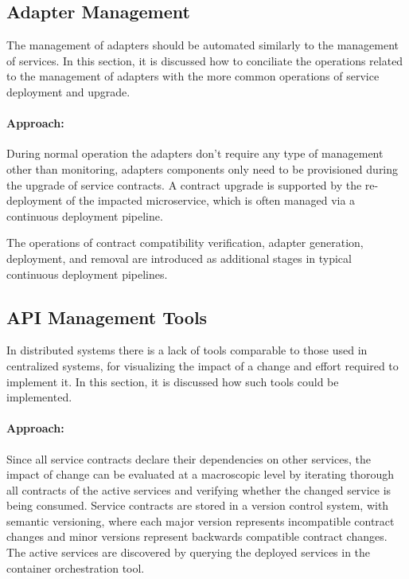 \subsection{Adapter Management} %
\label{sec:adapter_management}

The management of adapters should be automated similarly to the management of services.
In this section, it is discussed how to conciliate the operations related to the management of adapters with the more common operations of service deployment and upgrade.

\paragraph{Approach:}
During normal operation the adapters don't require any type of management other than monitoring,
adapters components only need to be provisioned during the upgrade of service contracts.
A contract upgrade is supported by the re-deployment of the impacted microservice, which is often managed via a continuous deployment pipeline.

The operations of contract compatibility verification, adapter generation, deployment,
and removal are introduced as additional stages in typical continuous deployment pipelines.

\subsection{API Management Tools} %
\label{sec:tools}

In distributed systems there is a lack of tools
comparable to those used in centralized systems, for visualizing the impact of a change and effort required to implement it.
In this section, it is discussed how such tools could be implemented.

\paragraph{Approach:}
Since all service contracts declare their dependencies on other services, the impact of change can be evaluated at a macroscopic level by
iterating thorough all contracts of the active services and verifying whether the changed service is being consumed.
Service contracts are stored in a version control system, with semantic versioning, where
each major version represents incompatible contract changes and minor versions represent backwards compatible contract changes.
The active services are discovered by querying the deployed services in the container orchestration tool.

